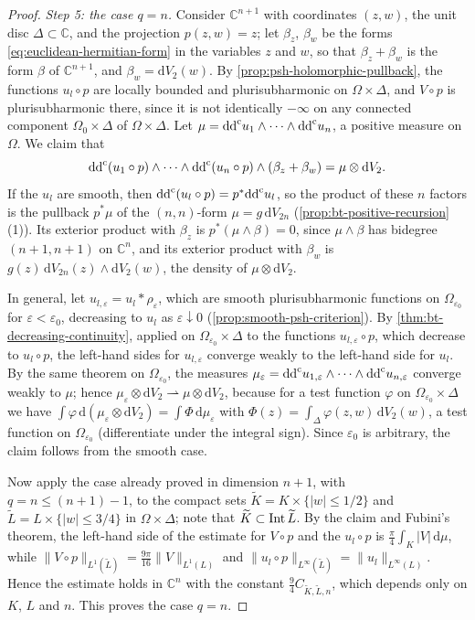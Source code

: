 \begin{proof}
\emph{Step 5: the case $q=n$.} Consider $\mathbb C^{n+1}$ with coordinates $(z,w)$, the unit disc $\Delta\subset\mathbb C$, and the projection $p(z,w)=z$; let $\beta_z$, $\beta_w$ be the forms \eqref{eq:euclidean-hermitian-form} in the variables $z$ and $w$, so that $\beta_z+\beta_w$ is the form $\beta$ of $\mathbb C^{n+1}$, and $\beta_w=\mathrm dV_2(w)$. By \cref{prop:psh-holomorphic-pullback}, the functions $u_l\circ p$ are locally bounded and plurisubharmonic on $\Omega\times\Delta$, and $V\circ p$ is plurisubharmonic there, since it is not identically $-\infty$ on any connected component $\Omega_0\times\Delta$ of $\Omega\times\Delta$. Let $\mu=\mathrm{dd}^{\mathrm{c}} u_1\wedge\cdots\wedge\mathrm{dd}^{\mathrm{c}} u_n$, a positive measure on $\Omega$. We claim that
\[
 \mathrm{dd}^{\mathrm{c}}(u_1\circ p)\wedge\cdots\wedge\mathrm{dd}^{\mathrm{c}}(u_n\circ p)\wedge(\beta_z+\beta_w)=\mu\otimes\mathrm{d}V_2.
\]
If the $u_l$ are smooth, then $\mathrm{dd}^{\mathrm{c}}(u_l\circ p)=p^*\mathrm{dd}^{\mathrm{c}} u_l$, so the product of these $n$ factors is the pullback $p^*\mu$ of the $(n,n)$-form $\mu=g\,\mathrm dV_{2n}$ (\cref{prop:bt-positive-recursion}(1)). Its exterior product with $\beta_z$ is $p^*(\mu\wedge\beta)=0$, since $\mu\wedge\beta$ has bidegree $(n+1,n+1)$ on $\mathbb C^n$, and its exterior product with $\beta_w$ is $g(z)\,\mathrm dV_{2n}(z)\wedge\mathrm dV_2(w)$, the density of $\mu\otimes\mathrm dV_2$.

In general, let $u_{l,\varepsilon}=u_l*\rho_\varepsilon$, which are smooth plurisubharmonic functions on $\Omega_{\varepsilon_0}$ for $\varepsilon<\varepsilon_0$, decreasing to $u_l$ as $\varepsilon\downarrow0$ (\cref{prop:smooth-psh-criterion}). By \cref{thm:bt-decreasing-continuity}, applied on $\Omega_{\varepsilon_0}\times\Delta$ to the functions $u_{l,\varepsilon}\circ p$, which decrease to $u_l\circ p$, the left-hand sides for $u_{l,\varepsilon}$ converge weakly to the left-hand side for $u_l$. By the same theorem on $\Omega_{\varepsilon_0}$, the measures $\mu_\varepsilon=\mathrm{dd}^{\mathrm{c}} u_{1,\varepsilon}\wedge\cdots\wedge\mathrm{dd}^{\mathrm{c}} u_{n,\varepsilon}$ converge weakly to $\mu$; hence $\mu_\varepsilon\otimes\mathrm dV_2\rightharpoonup\mu\otimes\mathrm dV_2$, because for a test function $\varphi$ on $\Omega_{\varepsilon_0}\times\Delta$ we have $\int\varphi\,\mathrm d(\mu_\varepsilon\otimes\mathrm dV_2)=\int\Phi\,\mathrm d\mu_\varepsilon$ with $\Phi(z)=\int_\Delta\varphi(z,w)\,\mathrm dV_2(w)$, a test function on $\Omega_{\varepsilon_0}$ (differentiate under the integral sign). Since $\varepsilon_0$ is arbitrary, the claim follows from the smooth case.

Now apply the case already proved in dimension $n+1$, with $q=n\le(n+1)-1$, to the compact sets $\widetilde K=K\times\{|w|\le1/2\}$ and $\widetilde L=L\times\{|w|\le3/4\}$ in $\Omega\times\Delta$; note that $\widetilde K\subset\operatorname{Int}\widetilde L$. By the claim and Fubini's theorem, the left-hand side of the estimate for $V\circ p$ and the $u_l\circ p$ is $\frac\pi4\int_K|V|\,\mathrm d\mu$, while $\|V\circ p\|_{L^1(\widetilde L)}=\frac{9\pi}{16}\|V\|_{L^1(L)}$ and $\|u_l\circ p\|_{L^\infty(\widetilde L)}=\|u_l\|_{L^\infty(L)}$. Hence the estimate holds in $\mathbb C^n$ with the constant $\frac94C_{\widetilde K,\widetilde L,n}$, which depends only on $K$, $L$ and $n$. This proves the case $q=n$.
\end{proof}
